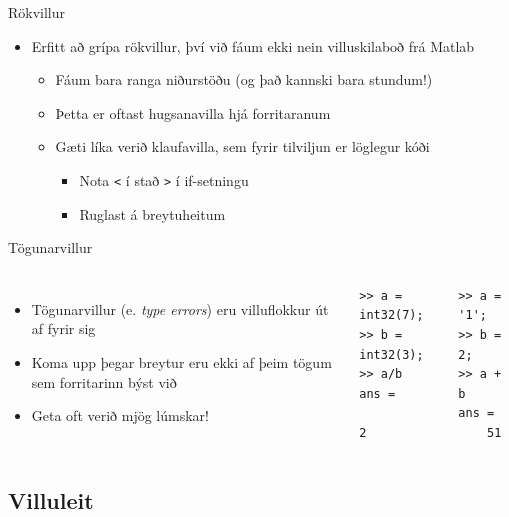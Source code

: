 \documentclass{beamer}
\begin{document}
\begin{frame}{Rökvillur}
\begin{itemize}
 \item Erfitt að grípa rökvillur, því við fáum ekki nein villuskilaboð frá Matlab
  \begin{itemize}
   \item Fáum bara ranga niðurstöðu (og það kannski bara stundum!)
   \item Þetta er oftast hugsanavilla hjá forritaranum
   \item Gæti líka verið klaufavilla, sem fyrir tilviljun er löglegur kóði
   \begin{itemize}
    \item Nota \texttt{<} í stað \texttt{>} í if-setningu
    \item Ruglast á breytuheitum
   \end{itemize}
  \end{itemize}
 \end{itemize}
\end{frame}

\begin{frame}[fragile]{Tögunarvillur}
\begin{columns}
\begin{itemize}
 \item Tögunarvillur (e. \emph{type errors}) eru villuflokkur út af fyrir sig
 \item Koma upp þegar breytur eru ekki af þeim tögum sem forritarinn býst við
 \item Geta oft verið mjög lúmskar!
\end{itemize}
\vspace{0.5cm}
\begin{verbatim}
>> a = int32(7);
>> b = int32(3);
>> a/b
ans =
           2
\end{verbatim}
\begin{verbatim}
>> a = '1';
>> b = 2;
>> a + b
ans =
    51
\end{verbatim}

\end{columns}
\end{frame}


\subsection{Villuleit}
\end{document}

